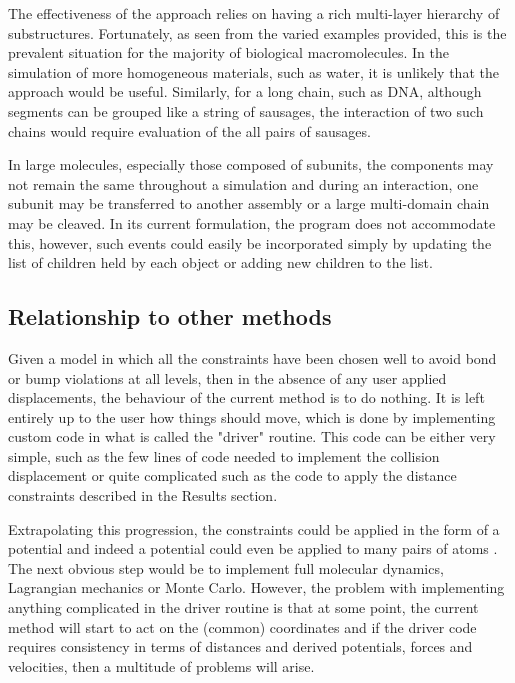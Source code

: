 The effectiveness of the approach relies on having a rich multi-layer
hierarchy of substructures.   Fortunately, as seen from the varied examples
provided, this is the prevalent situation for the majority of biological
macromolecules.   In the simulation of more homogeneous materials, such
as water, it is unlikely that the approach would be useful.  Similarly, for
a long chain, such as DNA, although segments can be grouped like a string
of sausages, the interaction of two such chains would require evaluation
of the all pairs of sausages.

In large molecules, especially those composed of subunits, the components may not
remain the same throughout a simulation and during an interaction, one subunit may
be transferred to another assembly or a large multi-domain chain may be cleaved.
In its current formulation, the program does not accommodate this, however, such
events could easily be incorporated simply by updating the list of children held
by each object or adding new children to the list. 

\subsection{Relationship to other methods}

Given a model in which all the constraints have been chosen well to avoid bond
or bump violations at all levels, then in the absence of any user applied displacements,
the behaviour of the current method is to do nothing.
It is left entirely up to the user how things should move, which is done by implementing
custom code in what is called the "driver" routine.    This code can be either very
simple, such as the few lines of code needed to implement the collision displacement or
quite complicated such as the code to apply the distance constraints described in the
Results section.

Extrapolating this progression, the constraints could be applied in the form of a potential and
indeed a potential could even be applied to many pairs of atoms \cite{PerioleXet09}.   The next
obvious step would be to implement full molecular dynamics, Lagrangian mechanics or Monte Carlo.
However, the problem with implementing anything complicated in the driver routine is that at some
point, the current method will start to act on the (common) coordinates and if the
driver code requires consistency in terms of distances and derived potentials, forces and
velocities, then a multitude of problems will arise.

